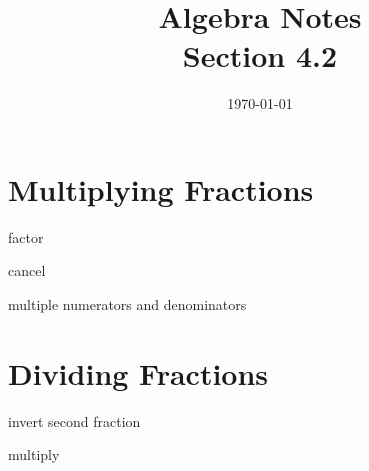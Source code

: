 \documentclass[letterpaper]{exam}
\title{Algebra Notes \\ Section 4.2 }
\author{}
\date{\today}
\begin{document}
  \maketitle

  \section{Multiplying Fractions} %

  \begin{enumerate*}
    \item factor 
    \item cancel
    \item multiple numerators and denominators
  \end{enumerate*}
  
  \section{Dividing Fractions} %

  \begin{enumerate*}
    \item invert second fraction
    \item multiply
  \end{enumerate*}
  
\end{document}
